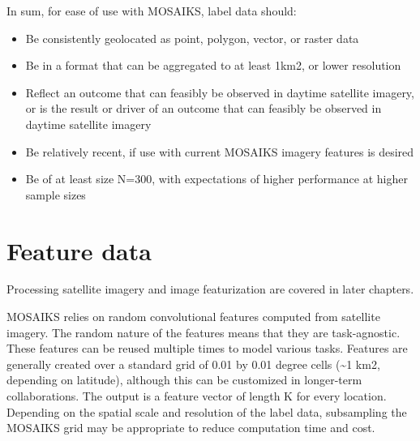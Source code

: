 \documentclass[
  letterpaper,
  DIV=11,
  numbers=noendperiod]{scrreprt}
\providecommand{\tightlist}{%
  \setlength{\itemsep}{0pt}\setlength{\parskip}{0pt}}\usepackage{longtable,booktabs,array}
\begin{document}
In sum, for ease of use with MOSAIKS, label data should:

\begin{itemize}
\tightlist
\item
  Be consistently geolocated as point, polygon, vector, or raster data\\
\item
  Be in a format that can be aggregated to at least 1km2, or lower
  resolution\\
\item
  Reflect an outcome that can feasibly be observed in daytime satellite
  imagery, or is the result or driver of an outcome that can feasibly be
  observed in daytime satellite imagery\\
\item
  Be relatively recent, if use with current MOSAIKS imagery features is
  desired\\
\item
  Be of at least size N=300, with expectations of higher performance at
  higher sample sizes
\end{itemize}

\hypertarget{feature-data}{%
\section*{Feature data}\label{feature-data}}


\begin{tcolorbox}[enhanced jigsaw, bottomtitle=1mm, rightrule=.15mm, coltitle=black, titlerule=0mm, toprule=.15mm, breakable, bottomrule=.15mm, left=2mm, leftrule=.75mm, opacitybacktitle=0.6, colbacktitle=quarto-callout-note-color!10!white, arc=.35mm, opacityback=0, title=\textcolor{quarto-callout-note-color}{\faInfo}\hspace{0.5em}{Note}, toptitle=1mm, colback=white, colframe=quarto-callout-note-color-frame]

Processing satellite imagery and image featurization are covered in
later chapters.

\end{tcolorbox}

MOSAIKS relies on random convolutional features computed from satellite
imagery. The random nature of the features means that they are
task-agnostic. These features can be reused multiple times to model
various tasks. Features are generally created over a standard grid of
0.01 by 0.01 degree cells (\textasciitilde1 km2, depending on latitude),
although this can be customized in longer-term collaborations. The
output is a feature vector of length K for every location. Depending on
the spatial scale and resolution of the label data, subsampling the
MOSAIKS grid may be appropriate to reduce computation time and cost.
\end{document}
